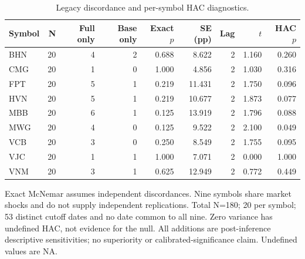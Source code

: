 \begin{table}[htbp]
\centering\small
\caption{Legacy discordance and per-symbol HAC diagnostics.}
\label{tab:d205_legacy}
\setlength{\tabcolsep}{3.5pt}
\begin{tabular}{lrrrrrrrr}
\hline
Symbol & N & Full only & Base only & Exact $p$ & SE (pp) & Lag & $t$ & HAC $p$ \\
\hline
BHN & 20 & 4 & 2 & 0.688 & 8.622 & 2 & 1.160 & 0.260 \\
CMG & 20 & 1 & 0 & 1.000 & 4.856 & 2 & 1.030 & 0.316 \\
FPT & 20 & 5 & 1 & 0.219 & 11.431 & 2 & 1.750 & 0.096 \\
HVN & 20 & 5 & 1 & 0.219 & 10.677 & 2 & 1.873 & 0.077 \\
MBB & 20 & 6 & 1 & 0.125 & 13.919 & 2 & 1.796 & 0.088 \\
MWG & 20 & 4 & 0 & 0.125 & 9.522 & 2 & 2.100 & 0.049 \\
VCB & 20 & 3 & 0 & 0.250 & 8.549 & 2 & 1.755 & 0.095 \\
VJC & 20 & 1 & 1 & 1.000 & 7.071 & 2 & 0.000 & 1.000 \\
VNM & 20 & 3 & 1 & 0.625 & 12.949 & 2 & 0.772 & 0.449 \\
\hline
\end{tabular}
\par\smallskip\footnotesize Exact McNemar assumes independent discordances. Nine symbols share market shocks and do not supply independent replications. Total N=180; 20 per symbol; 53 distinct cutoff dates and no date common to all nine. Zero variance has undefined HAC, not evidence for the null. All additions are post-inference descriptive sensitivities; no superiority or calibrated-significance claim. Undefined values are NA.
\end{table}
